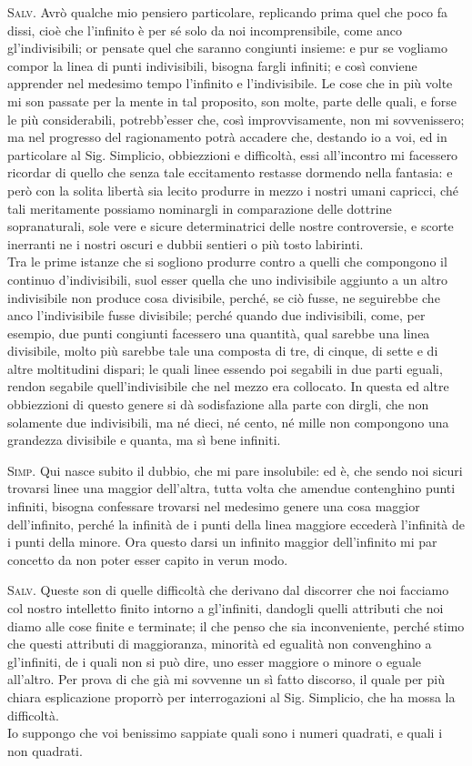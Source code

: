 \documentclass[11pt,twoside,openany]{book}
\newcommand{\speaker}[1]{\textcolor{rubric}{\textsc{#1}}\space}
\begin{document}
\speaker{Salv.} Avrò qualche mio pensiero particolare, replicando prima quel che poco fa dissi, cioè che l'infinito è per sé solo da noi incomprensibile, come anco gl'indivisibili; or pensate quel che saranno congiunti insieme: e pur se vogliamo compor la linea di punti indivisibili, bisogna fargli infiniti; e così conviene apprender nel medesimo tempo l'infinito e l'indivisibile. Le cose che in più volte mi son passate per la mente in tal proposito, son molte, parte delle quali, e forse le più considerabili, potrebb'esser che, così improvvisamente, non mi sovvenissero; ma nel progresso del ragionamento potrà accadere che, destando io a voi, ed in particolare al Sig. Simplicio, obbiezzioni e difficoltà, essi all'incontro mi facessero ricordar di quello che senza tale eccitamento restasse dormendo nella fantasia: e però con la solita libertà sia lecito produrre in mezzo i nostri umani capricci, ché tali meritamente possiamo nominargli in comparazione delle dottrine sopranaturali, sole vere e sicure determinatrici delle nostre controversie, e scorte inerranti ne i nostri oscuri e dubbii sentieri o più tosto labirinti.\\ Tra le prime istanze che si sogliono produrre contro a quelli che compongono il continuo d'indivisibili, suol esser quella che uno indivisibile aggiunto a un altro indivisibile non produce cosa divisibile, perché, se ciò fusse, ne seguirebbe che anco l'indivisibile fusse divisibile; perché quando due indivisibili, come, per esempio, due punti congiunti facessero una quantità, qual sarebbe una linea divisibile, molto più sarebbe tale una composta di tre, di cinque, di sette e di altre moltitudini dispari; le quali linee essendo poi segabili in due parti eguali, rendon segabile quell'indivisibile che nel mezzo era collocato. In questa ed altre obbiezzioni di questo genere si dà sodisfazione alla parte con dirgli, che non solamente due indivisibili, ma né dieci, né cento, né mille non compongono una grandezza divisibile e quanta, ma sì bene infiniti.

\speaker{Simp.} Qui nasce subito il dubbio, che mi pare insolubile: ed è, che sendo noi sicuri trovarsi linee una maggior dell'altra, tutta volta che amendue contenghino punti infiniti, bisogna confessare trovarsi nel medesimo genere una cosa maggior dell'infinito, perché la infinità de i punti della linea maggiore eccederà l'infinità de i punti della minore. Ora questo darsi un infinito maggior dell'infinito mi par concetto da non poter esser capito in verun modo.

\speaker{Salv.} Queste son di quelle difficoltà che derivano dal discorrer che noi facciamo col nostro intelletto finito intorno a gl'infiniti, dandogli quelli attributi che noi diamo alle cose finite e terminate; il che penso che sia inconveniente, perché stimo che questi attributi di maggioranza, minorità ed egualità non convenghino a gl'infiniti, de i quali non si può dire, uno esser maggiore o minore o eguale all'altro. Per prova di che già mi sovvenne un sì fatto discorso, il quale per più chiara esplicazione proporrò per interrogazioni al Sig. Simplicio, che ha mossa la difficoltà.\\ Io suppongo che voi benissimo sappiate quali sono i numeri quadrati, e quali i non quadrati.
\end{document}

